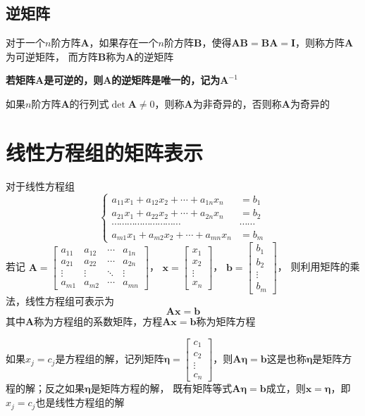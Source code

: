 \documentclass[UTF8]{ctexart}
\newcommand{\ve}[1]{{\bm{#1}}}
\newcommand{\mat}[1]{\ve{#1}}
\newcommand{\emplin}{\vspace{1em}}
\begin{document}
\subsection*{逆矩阵}

对于一个$n$阶方阵$\mat{A}$，如果存在一个$n$阶方阵$\mat{B}$，使得$\mat{A}\mat{B}=\mat{B}\mat{A}=\mat{I}$，则称方阵$\mat{A}$为可逆矩阵，
而方阵$\mat{B}$称为$\mat{A}$的逆矩阵

\textbf{若矩阵$\mat{A}$是可逆的，则$\mat{A}$的逆矩阵是唯一的，记为$\mat{A}^{-1}$}

\emplin

如果$n$阶方阵$\mat{A}$的行列式$\det\mat{A}\ne0$，则称$\mat{A}$为非奇异的，否则称$\mat{A}$为奇异的




\section*{线性方程组的矩阵表示}
对于线性方程组
\[\left\{
\begin{aligned}
a_{11}x_1+a_{12}x_2+\cdots+a_{1n}x_n&=b_1\\
a_{21}x_1+a_{22}x_2+\cdots+a_{2n}x_n&=b_2\\
\cdots\cdots\cdots\cdots\cdots\cdots\cdots\cdots\cdots&\cdots\cdots\\
a_{m1}x_1+a_{m2}x_2+\cdots+a_{mn}x_n&=b_m
\end{aligned}
\right.\]
若记
$\displaystyle\mat{A}=\begin{bmatrix}
a_{11}&a_{12}&\cdots&a_{1n}\\
a_{21}&a_{22}&\cdots&a_{2n}\\
\vdots&\vdots&\ddots&\vdots\\
a_{m1}&a_{m2}&\cdots&a_{mn}
\end{bmatrix}$，
$\displaystyle\mat{x}=\begin{bmatrix}
x_1\\
x_2\\
\vdots\\
x_n
\end{bmatrix}$，
$\displaystyle\mat{b}=\begin{bmatrix}
b_1\\
b_2\\
\vdots\\
b_m
\end{bmatrix}$，
则利用矩阵的乘法，线性方程组可表示为
\[\mat{A}\mat{x}=\mat{b}\]
其中$\mat{A}$称为方程组的系数矩阵，方程$\mat{A}\mat{x}=\mat{b}$称为矩阵方程

如果$x_j=c_j$是方程组的解，记列矩阵$\mat{\eta}=\begin{bmatrix}
c_1\\
c_2\\
\vdots\\
c_n
\end{bmatrix}$，则$\mat{A}\mat{\eta}=\mat{b}$这是也称$\mat{\eta}$是矩阵方程的解；反之如果$\mat{\eta}$是矩阵方程的解，
既有矩阵等式$\mat{A}\mat{\eta}=\mat{b}$成立，则$\mat{x}=\mat{\eta}$，即$x_j=c_j$也是线性方程组的解
\end{document}
